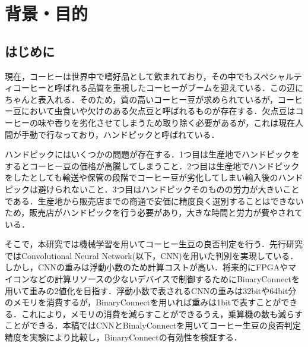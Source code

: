 

\chapter{背景・目的}

\setcounter{page}{1}


\section{はじめに}
現在，コーヒーは世界中で嗜好品として飲まれており，その中でもスペシャルティコーヒーと呼ばれる品質を重視したコーヒーがブームを迎えている．この辺にちゃんと表入れる．そのため，質の高いコーヒー豆が求められているが，コーヒー豆において虫食いや欠けのある欠点豆と呼ばれるものが存在する．欠点豆はコーヒーの味や香りを劣化させてしまうため取り除く必要があるが，これは現在人間が手動で行なっており，ハンドピックと呼ばれている．

ハンドピックにはいくつかの問題が存在する．1つ目は生産地でハンドピックをするとコーヒー豆の価格が高騰してしまうこと．2つ目は生産地でハンドピックをしたとしても輸送や保管の段階でコーヒー豆が劣化してしまい輸入後のハンドピックは避けられないこと．3つ目はハンドピックそのものの労力が大きいことである．生産地から販売店までの商通で安価に精度良く選別することはできないため，販売店がハンドピックを行う必要があり，大きな時間と労力が費やされている．

そこで，本研究では機械学習を用いてコーヒー生豆の良否判定を行う．先行研究ではConvolutional Neural Network(以下，CNN)を用いた判別を実現している．しかし，CNNの重みは浮動小数のため計算コストが高い．将来的にFPGAやマイコンなどの計算リソースの少ないデバイスで制御するためにBinaryConnectを用いて重みの2値化を目指す．浮動小数で表されるCNNの重みは32bitや64bit分のメモリを消費するが，BinaryConnectを用いれば重みは1bitで表すことができる．これにより，メモリの消費を減らすことができるうえ，乗算機の数も減らすことができる\cite{binaryconnect}．本稿ではCNNとBinalyConnectを用いてコーヒー生豆の良否判定精度を実験により比較し，BinaryConnectの有効性を検証する．
